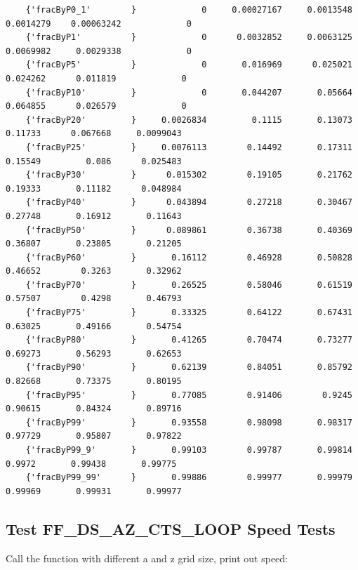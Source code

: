 \documentclass[
]{book}
\begin{document}
\begin{verbatim}
    {'fracByP0_1'        }             0     0.00027167     0.0013548     0.0014279    0.00063242             0 
    {'fracByP1'          }             0      0.0032852     0.0063125     0.0069982     0.0029338             0 
    {'fracByP5'          }             0       0.016969      0.025021      0.024262      0.011819             0 
    {'fracByP10'         }             0       0.044207       0.05664      0.064855      0.026579             0 
    {'fracByP20'         }     0.0026834         0.1115       0.13073       0.11733      0.067668     0.0099043 
    {'fracByP25'         }     0.0076113        0.14492       0.17311       0.15549         0.086      0.025483 
    {'fracByP30'         }      0.015302        0.19105       0.21762       0.19333       0.11182      0.048984 
    {'fracByP40'         }      0.043894        0.27218       0.30467       0.27748       0.16912       0.11643 
    {'fracByP50'         }      0.089861        0.36738       0.40369       0.36807       0.23805       0.21205 
    {'fracByP60'         }       0.16112        0.46928       0.50828       0.46652        0.3263       0.32962 
    {'fracByP70'         }       0.26525        0.58046       0.61519       0.57507        0.4298       0.46793 
    {'fracByP75'         }       0.33325        0.64122       0.67431       0.63025       0.49166       0.54754 
    {'fracByP80'         }       0.41265        0.70474       0.73277       0.69273       0.56293       0.62653 
    {'fracByP90'         }       0.62139        0.84051       0.85792       0.82668       0.73375       0.80195 
    {'fracByP95'         }       0.77085        0.91406        0.9245       0.90615       0.84324       0.89716 
    {'fracByP99'         }       0.93558        0.98098       0.98317       0.97729       0.95807       0.97822 
    {'fracByP99_9'       }       0.99103        0.99787       0.99814        0.9972       0.99438       0.99775 
    {'fracByP99_99'      }       0.99886        0.99977       0.99979       0.99969       0.99931       0.99977 
\end{verbatim}

\hypertarget{test-ff_ds_az_cts_loop-speed-tests}{%
\subsection{Test FF\_DS\_AZ\_CTS\_LOOP Speed Tests}\label{test-ff_ds_az_cts_loop-speed-tests}}

Call the function with different a and z grid size, print out speed:
\end{document}
